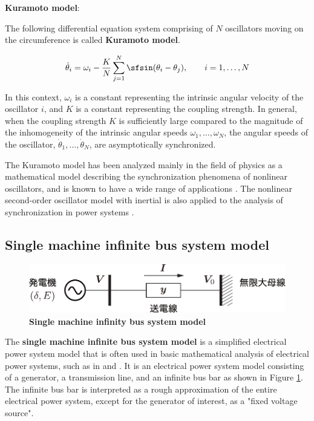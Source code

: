 \documentclass[graybox, envcountchap]{svmult}
\begin{document}
\begin{COLUMN}

\noindent\textbf{Kuramoto model}:

The following differential equation system comprising of $N$ oscillators moving
on the circumference is called \textbf{Kuramoto model}.

\[
  \dot{\theta}_i = \omega_i - \frac{K}{N} \sum_{j=1}^N \sfsin (\theta_i - \theta_j),
  \qquad
  i=1,\ldots,N
\]

In this context, $\omega_i$ is a constant representing the intrinsic angular
velocity of the oscillator $i$, and $K$ is a constant representing the coupling
strength. In general, when the coupling strength $K$ is sufficiently large
compared to the magnitude of the inhomogeneity of the intrinsic angular speeds
$\omega_1,\ldots,\omega_N$, the angular speeds of the oscillator,
$\dot{\theta}_1,\ldots,\dot{\theta}_N$, are asymptotically synchronized.

The Kuramoto model has been analyzed mainly in the field of physics as a
mathematical model describing the synchronization phenomena of nonlinear
oscillators, and is known to have a wide range of applications
\cite{kuramoto1975self,kuramoto2003chemical}. The nonlinear second-order
oscillator model with inertial is also applied to the analysis of
synchronization in power systems
\cite{dorfler2012synchronization,dorfler2013synchronization,nagata2014node,nishikawa2015comparative}.
\end{COLUMN}

\subsection{Single machine infinite bus system model}\label{sec:onemachine}

\begin{figure}[t]
\centering
\includegraphics[width = .70\linewidth]{figs/inf1bus}
\medskip
\caption{\textbf{Single machine infinity bus system model}}
\label{fig:inf1bus}
\medskip
\end{figure}

The \textbf{single machine infinite bus system model} is a simplified electrical
power system model that is often used in basic mathematical analysis of
electrical power systems, such as in \cite[Section 1.3]{taniguchi2011power} and
\cite[Section 6.3, Section 8.3]{kato2017electric}. It is an electrical power
system model consisting of a generator, a transmission line, and an infinite bus
bar as shown in Figure \ref{fig:inf1bus}. The infinite bus bar is interpreted as
a rough approximation of the entire electrical power system, except for the
generator of interest, as a "fixed voltage source".
\end{document}
